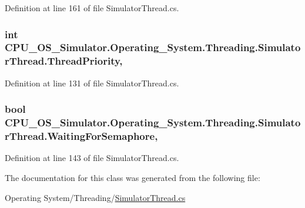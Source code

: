 Definition at line 161 of file Simulator\+Thread.\+cs.

\hypertarget{class_c_p_u___o_s___simulator_1_1_operating___system_1_1_threading_1_1_simulator_thread_a1041bed3a6e4f372876a927d520f04d0}{}
\subsubsection[{Thread\+Priority}]{\setlength{\rightskip}{0pt plus 5cm}int C\+P\+U\+\_\+\+O\+S\+\_\+\+Simulator.\+Operating\+\_\+\+System.\+Threading.\+Simulator\+Thread.\+Thread\+Priority\hspace{0.3cm}{\ttfamily [get]}, {\ttfamily [set]}}\label{class_c_p_u___o_s___simulator_1_1_operating___system_1_1_threading_1_1_simulator_thread_a1041bed3a6e4f372876a927d520f04d0}


Definition at line 131 of file Simulator\+Thread.\+cs.

\hypertarget{class_c_p_u___o_s___simulator_1_1_operating___system_1_1_threading_1_1_simulator_thread_a65e5dc40e2db1166bc47acc053c8df5d}{}
\subsubsection[{Waiting\+For\+Semaphore}]{\setlength{\rightskip}{0pt plus 5cm}bool C\+P\+U\+\_\+\+O\+S\+\_\+\+Simulator.\+Operating\+\_\+\+System.\+Threading.\+Simulator\+Thread.\+Waiting\+For\+Semaphore\hspace{0.3cm}{\ttfamily [get]}, {\ttfamily [set]}}\label{class_c_p_u___o_s___simulator_1_1_operating___system_1_1_threading_1_1_simulator_thread_a65e5dc40e2db1166bc47acc053c8df5d}


Definition at line 143 of file Simulator\+Thread.\+cs.



The documentation for this class was generated from the following file\+:\begin{DoxyCompactItemize}
\item 
Operating System/\+Threading/\hyperlink{_simulator_thread_8cs}{Simulator\+Thread.\+cs}\end{DoxyCompactItemize}
